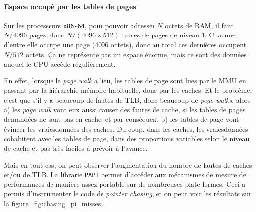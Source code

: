 \paragraph{Espace occupé par les tables de pages} Sur les processeurs
\texttt{x86-64}, pour pouvoir adresser $N$ octets de RAM, il faut $N / 4096$
pages, donc $N / (4096 \times 512)$ tables de pages de niveau 1. Chacune d'entre
elle occupe une page (4096 octets), donc au total ces dernières occupent $N/512$
octets. Ça ne représente pas un espace énorme, mais ce sont des données auquel
le CPU accède régulièrement.

En effet, lorsque le \emph{page walk} a lieu, les tables de page sont lues par
le MMU en passant par la hiérarchie mémoire habituelle, donc par les caches. Et
le problème, c'est que s'il y a beaucoup de fautes de TLB, donc beaucoup de
\emph{page walks}, alors a) les \emph{page walk} vont eux aussi causer des
fautes de cache, si les tables de pages demandées ne sont pas en cache, et par
conséquent b) les tables de page vont évincer les \og vraies\fg données des
caches. Du coup, dans les caches, les \og vraies\fg données cohabitent avec les
tables de page, dans des proportions variables selon le niveau de cache et pas
très faciles à prévoir à l'avance.



Mais en tout cas, on peut observer l'augmentation du nombre de fautes de caches
et/ou de TLB. La librarie \texttt{PAPI} permet d'accéder aux mécanismes de
mesure de performances de manière assez portable sur de nombreuses
plate-formes. Ceci a permis d'instrumenter le code de \emph{pointer chasing}, et
on peut voir les résultats sur la figure~\ref{fig:chasing_pi_misses}.

